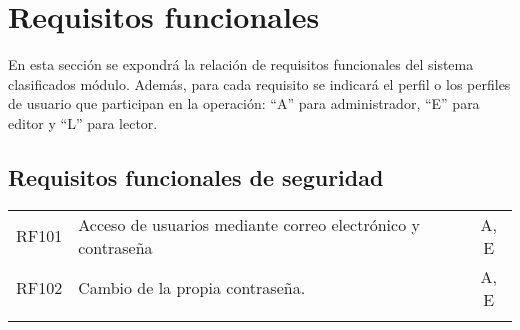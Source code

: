 \section{Requisitos funcionales}
En esta sección se expondrá la relación de requisitos funcionales del sistema clasificados módulo. Además, para cada requisito se indicará el perfil o los perfiles de usuario que participan en la operación: ``A'' para administrador, ``E'' para editor y ``L'' para lector.


\renewcommand{\arraystretch}{1.5} %

\subsection{Requisitos funcionales de seguridad}

\begin{longtable}{lp{13cm}c}
  RF101\label{RF101} & Acceso de usuarios mediante correo electrónico y contraseña & A, E \\
  RF102\label{RF102} & Cambio de la propia contraseña. & A, E \\
  \label{cuadro:requisitos-funcionales-de-seguridad}
\end{longtable}

